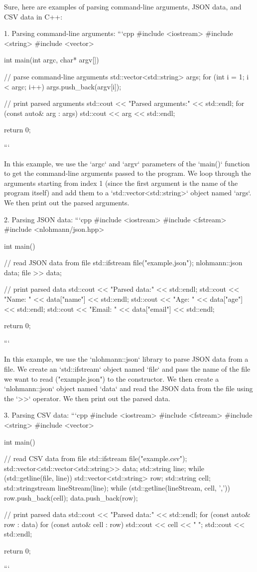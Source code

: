 Sure, here are examples of parsing command-line arguments, JSON data, and CSV data in C++:

1. Parsing command-line arguments:
```cpp
#include <iostream>
#include <string>
#include <vector>

int main(int argc, char* argv[]) {
    // parse command-line arguments
    std::vector<std::string> args;
    for (int i = 1; i < argc; i++) {
        args.push_back(argv[i]);
    }

    // print parsed arguments
    std::cout << "Parsed arguments:" << std::endl;
    for (const auto& arg : args) {
        std::cout << arg << std::endl;
    }

    return 0;
}
```

In this example, we use the `argc` and `argv` parameters of the `main()` function to get the command-line arguments passed to the program. We loop through the arguments starting from index 1 (since the first argument is the name of the program itself) and add them to a `std::vector<std::string>` object named `args`. We then print out the parsed arguments.

2. Parsing JSON data:
```cpp
#include <iostream>
#include <fstream>
#include <nlohmann/json.hpp>

int main() {
    // read JSON data from file
    std::ifstream file("example.json");
    nlohmann::json data;
    file >> data;

    // print parsed data
    std::cout << "Parsed data:" << std::endl;
    std::cout << "Name: " << data["name"] << std::endl;
    std::cout << "Age: " << data["age"] << std::endl;
    std::cout << "Email: " << data["email"] << std::endl;

    return 0;
}
```

In this example, we use the `nlohmann::json` library to parse JSON data from a file. We create an `std::ifstream` object named `file` and pass the name of the file we want to read ("example.json") to the constructor. We then create a `nlohmann::json` object named `data` and read the JSON data from the file using the `>>` operator. We then print out the parsed data.

3. Parsing CSV data:
```cpp
#include <iostream>
#include <fstream>
#include <string>
#include <vector>

int main() {
    // read CSV data from file
    std::ifstream file("example.csv");
    std::vector<std::vector<std::string>> data;
    std::string line;
    while (std::getline(file, line)) {
        std::vector<std::string> row;
        std::string cell;
        std::stringstream lineStream(line);
        while (std::getline(lineStream, cell, ',')) {
            row.push_back(cell);
        }
        data.push_back(row);
    }

    // print parsed data
    std::cout << "Parsed data:" << std::endl;
    for (const auto& row : data) {
        for (const auto& cell : row) {
            std::cout << cell << " ";
        }
        std::cout << std::endl;
    }

    return 0;
}
```

